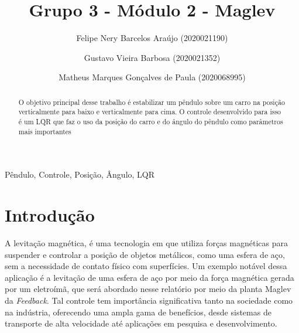 \documentclass{ifacconf}
\begin{document}
\begin{frontmatter}

\title{Grupo 3 - Módulo 2 - Maglev} 


\author[First]{Felipe Nery Barcelos Araújo (2020021190)} 
\author[Second]{Gustavo Vieira Barbosa (2020021352)} 
\author[First]{Matheus Marques Gonçalves de Paula (2020068995)}

\address[First]{
  Engenharia de Controle e Automação,\\ Universidade Federal de Minas Gerais, MG \\
   (e-mails: felipenery@ufmg.br, gustavovbarbosa@ufmg.br, mmgp@ufmg.br)
}

\begin{abstract}               
  O objetivo principal desse trabalho é estabilizar um pêndulo sobre um carro na
  posição verticalmente para baixo e verticalmente para cima. O controle desenvolvido para isso
  é um LQR que faz o uso da posição do carro e do ângulo do pêndulo como parâmetros mais importantes  
\end{abstract}

\begin{keyword}
Pêndulo, Controle, Posição, Ângulo, LQR 
\end{keyword}

\end{frontmatter}


\section{Introdução}

A levitação magnética, é uma tecnologia em que utiliza forças magnéticas para suspender e controlar a posição de
objetos metálicos, como uma esfera de aço, sem a necessidade de contato físico com superfícies. Um exemplo notável dessa aplicação é a levitação de uma esfera
de aço por meio da força magnética gerada por um eletroímã, que será abordado nesse relatório por meio da planta Maglev da \textit{Feedback}. Tal controle tem importância significativa 
tanto na sociedade como na indústria, oferecendo uma ampla gama de benefícios, desde sistemas de transporte de alta velocidade até aplicações em pesquisa e desenvolvimento.
\end{document}

